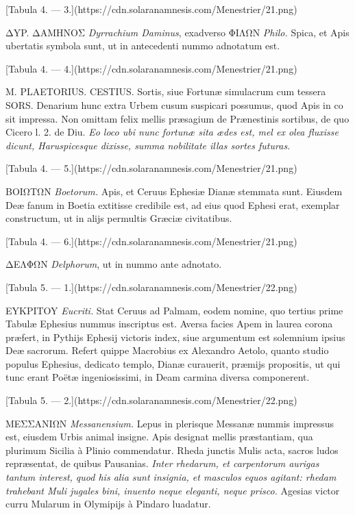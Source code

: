 \documentclass[a4paper, 11pt, oneside, polutonikogreek, latin]{article}
\begin{document}
[Tabula 4. --- 3.](https://cdn.solaranamnesis.com/Menestrier/21.png)

ΔYP. ΔAMHNOΣ \emph{Dyrrachium Daminus}, exadverso ΦIΛΩN \emph{Philo.} Spica, et Apis ubertatis symbola sunt, ut in antecedenti nummo adnotatum est.

[Tabula 4. --- 4.](https://cdn.solaranamnesis.com/Menestrier/21.png)

M. PLAETORIUS. CESTIUS. Sortis, siue Fortunæ simulacrum cum tessera SORS. Denarium hunc extra Urbem cusum suspicari possumus, quod Apis in co sit impressa. Non omittam felix mellis præsagium de Prænestinis sortibus, de quo Cicero l. 2. de Diu. \emph{Eo loco ubi nunc fortunæ sita ædes est, mel ex olea fluxisse dicunt, Haruspicesque dixisse, summa nobilitate illas sortes futuras.}

[Tabula 4. --- 5.](https://cdn.solaranamnesis.com/Menestrier/21.png)

BOIΩTΩN \emph{Boetorum.} Apis, et Ceruus Ephesiæ Dianæ stemmata sunt. Eiusdem Deæ fanum in Boetia extitisse credibile est, ad eius quod Ephesi erat, exemplar constructum, ut in alijs permultis Græciæ civitatibus.

[Tabula 4. --- 6.](https://cdn.solaranamnesis.com/Menestrier/21.png)

ΔEΛΦΩN \emph{Delphorum}, ut in nummo ante adnotato.

[Tabula 5. --- 1.](https://cdn.solaranamnesis.com/Menestrier/22.png)

EYKPITOY \emph{Eucriti.} Stat Ceruus ad Palmam, eodem nomine, quo tertius prime Tabulæ Ephesius nummus inscriptus est. Aversa facies Apem in laurea corona præfert, in Pythijs Ephesij victoris index, siue argumentum est solemnium ipsius Deæ sacrorum. Refert quippe Macrobius ex Alexandro Aetolo, quanto studio populus Ephesius, dedicato templo, Dianæ curauerit, præmijs propositis, ut qui tunc erant Poëtæ ingeniosissimi, in Deam carmina diversa componerent.

[Tabula 5. --- 2.](https://cdn.solaranamnesis.com/Menestrier/22.png)

MEΣΣANIΩN \emph{Messanensium.} Lepus in plerisque Messanæ nummis impressus est, eiusdem Urbis animal insigne. Apis designat mellis præstantiam, qua plurimum Sicilia à Plinio commendatur. Rheda junctis Mulis acta, sacros ludos repræsentat, de quibus Pausanias. \emph{Inter rhedarum, et carpentorum aurigas tantum interest, quod his alia sunt insignia, et masculos equos agitant: rhedam trahebant Muli jugales bini, inuento neque eleganti, neque prisco.} Agesias victor curru Mularum in Olymipijs à Pindaro luadatur.
\end{document}
